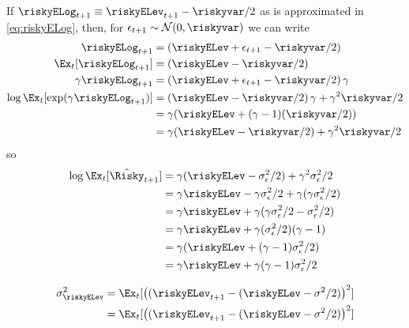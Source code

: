 \documentclass{handout}
\begin{document}
    If $\riskyELog_{t+1} \equiv \riskyELev_{t+1} - \riskyvar/2$ as is approximated in \eqref{eq:riskyELog}, then, for $\epsilon_{t+1} \sim \mathcal{N}(0,\riskyvar)$ we can write
    \begin{equation}\begin{gathered}\begin{aligned}
          \riskyELog_{t+1} & = (\riskyELev+\epsilon_{t+1} - \riskyvar/2) 
\\ \Ex_{t}[\riskyELog_{t+1}] & = (\riskyELev- \riskyvar/2) 
\\ \gamma \riskyELog_{t+1} & = \left(\riskyELev+\epsilon_{t+1} - \riskyvar/2\right)\gamma 
\\ \log \Ex_{t}[\exp( \gamma \riskyELog_{t+1})] & = \left(\riskyELev - \riskyvar/2\right)\gamma+\gamma^{2}\riskyvar/2 
\\ & = \gamma (\riskyELev + (\gamma-1)(\riskyvar/2) )
\\ & = \gamma (\riskyELev - \riskyvar/2) + \gamma^{2}\riskyvar/2
        \end{aligned}\end{gathered}\end{equation}
so
\begin{equation}\begin{gathered}\begin{aligned}
      \log \Ex_{t}[\hat{\Risky}_{t+1}] & = \gamma (\riskyELev - \sigma^{2}_{\epsilon}/2)+\gamma^{2}\sigma^{2}_{\epsilon}/2
\\ & = \gamma \riskyELev - \gamma \sigma^{2}_{\epsilon}/2 + \gamma (\gamma \sigma^{2}_{\epsilon}/2)
      \\ & = \gamma \riskyELev  + \gamma (\gamma \sigma^{2}_{\epsilon}/2-\sigma^{2}_{\epsilon}/2)
      \\ & = \gamma \riskyELev  + \gamma (\sigma^{2}_{\epsilon}/2)(\gamma -1)      
      \\ & = \gamma (\riskyELev  + (\gamma-1)\sigma^{2}_{\epsilon}/2)
      \\ & = \gamma \riskyELev  + \gamma(\gamma-1)\sigma^{2}_{\epsilon}/2
    \end{aligned}\end{gathered}\end{equation}

      
\begin{equation}\begin{gathered}\begin{aligned}
      \sigma^{2}_{\riskyELev} & = \Ex_{t}[\left((\riskyELev_{t+1} - (\riskyELev-\sigma^{2}/2)\right)^{2}]
      \\ & = \Ex_{t}[\left((\riskyELev_{t+1} - (\riskyELev-\sigma^{2}/2)\right)^{2}]
\end{aligned}\end{gathered}\end{equation}
\end{document}
